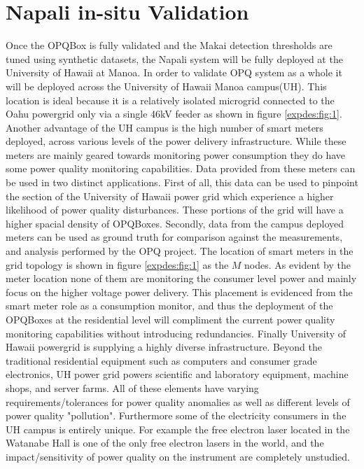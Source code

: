 \section{Napali in-situ Validation}
Once the OPQBox is fully validated and the Makai detection thresholds are tuned using synthetic datasets, the Napali system will be fully deployed at the University of Hawaii at Manoa. In order to validate OPQ system as a whole it will be deployed across the University of Hawaii Manoa campus(UH). This location is ideal because it is a relatively isolated microgrid connected to the Oahu powergrid only via a single 46kV feeder as shown in figure \ref{expdes:fig:1}. Another advantage of the UH campus is the high number of smart meters deployed, across various levels of the power delivery infrastructure. While these meters are mainly geared towards monitoring power consumption they do have some power quality monitoring capabilities. Data provided from these meters can be used in two distinct applications. First of all, this data can be used to pinpoint the section of the University of Hawaii power grid which experience a higher likelihood of power quality disturbances. These portions of the grid will have a higher spacial density of OPQBoxes. Secondly, data from the campus deployed meters can be used as ground truth for comparison against the measurements, and analysis performed by the OPQ project. The location of smart meters in the grid topology is shown in figure \ref{expdes:fig:1} as the $M$ nodes. As evident by the meter location none of them are monitoring the consumer level power and mainly focus on the higher voltage power delivery. This placement is evidenced from the smart meter role as a consumption monitor, and thus the deployment of the OPQBoxes at the residential level will compliment the current power quality monitoring capabilities without introducing redundancies. Finally University of Hawaii powergrid is supplying a highly diverse infrastructure. Beyond the traditional residential equipment such as computers and consumer grade electronics, UH power grid powers scientific and laboratory equipment, machine shops, and server farms. All of these elements have varying requirements/tolerances for power quality anomalies as well as different levels of power quality "pollution". Furthermore some of the electricity consumers in the UH campus is entirely unique. For example the free electron laser located in the Watanabe Hall is one of the only free electron lasers in the world, and the impact/sensitivity of power quality on the instrument are completely unstudied.
